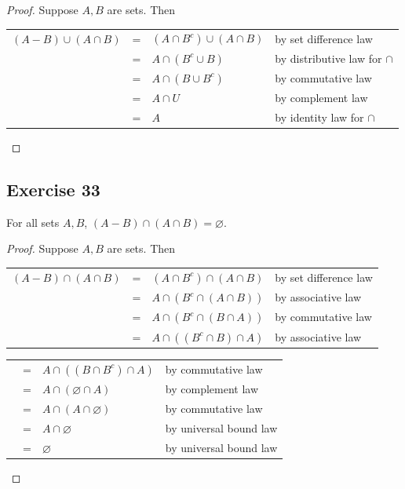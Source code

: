 \documentclass[14pt]{extarticle}
\newcommand{\es}{\varnothing}
\newcommand{\cy}{\color{cyan}}
\begin{document}
\begin{proof}
Suppose $A,B$ are sets. Then
\begin{center}
\begin{tabular}{rcll}
\((A - B) \cup (A \cap B)\) & = & \((A \cap B^c) \cup (A \cap B)\) & {\cy by set difference law} \\
\(\) & = & \(A \cap (B^c \cup B)\) & {\cy by distributive law for $\cap$} \\
\(\) & = & \(A \cap (B \cup B^c)\) & {\cy by commutative law} \\
\(\) & = & \(A \cap U\) & {\cy by complement law} \\
\(\) & = & \(A\) & {\cy by identity law for $\cap$}
\end{tabular}
\end{center}
\end{proof}

\subsection{Exercise 33}
For all sets $A, B$, \((A - B) \cap (A \cap B) = \es\).

\begin{proof}
Suppose $A,B$ are sets. Then
\begin{center}
\begin{tabular}{rcll}
\((A - B) \cap (A \cap B)\) & = & \((A \cap B^c) \cap (A \cap B)\) & {\cy by set difference law} \\
\(\) & = & \(A \cap (B^c \cap (A \cap B))\) & {\cy by associative law} \\
\(\) & = & \(A \cap (B^c \cap (B \cap A))\) & {\cy by commutative law} \\
\(\) & = & \(A \cap ((B^c \cap B) \cap A)\) & {\cy by associative law}
\end{tabular}
\end{center}
\begin{center}
\begin{tabular}{rcll}
\(\) & = & \(A \cap ((B \cap B^c) \cap A)\) & {\cy by commutative law} \\
\(\) & = & \(A \cap (\es \cap A)\) & {\cy by complement law} \\
\(\) & = & \(A \cap (A \cap \es)\) & {\cy by commutative law} \\
\(\) & = & \(A \cap \es\) & {\cy by universal bound law} \\
\(\) & = & \(\es\) & {\cy by universal bound law}
\end{tabular}
\end{center}
\end{proof}
\end{document}
